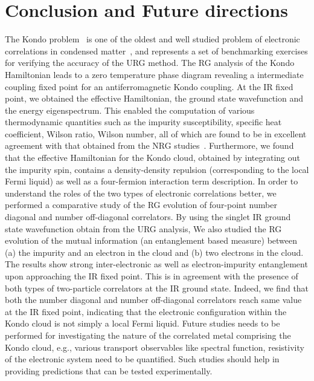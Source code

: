 \documentclass[aps,prb,preprint,groupedaddress]{revtex4-2}
\begin{document}
\section{Conclusion and Future directions}
The Kondo problem~\cite{kondo1964resistance} is one of the oldest and well studied problem of electronic correlations in condensed matter~\cite{anderson1970poor,wilson1975}, and represents a set of benchmarking exercises for verifying the accuracy of the URG method.  The RG analysis of the Kondo Hamiltonian leads to a zero temperature phase diagram revealing a intermediate coupling fixed point for an antiferromagnetic Kondo coupling. At the IR fixed point, we obtained the effective Hamiltonian, the ground state wavefunction and the energy eigenspectrum. This enabled the computation of various  thermodynamic quantities such as the impurity susceptibility, specific heat coefficient, Wilson ratio, Wilson number, all of which  are found to be in excellent agreement with that obtained from the NRG studies~\cite{bullaNRGreview}. 
\pin
Furthermore, we found that the effective Hamiltonian for the Kondo cloud, obtained by integrating out the impurity spin, contains a density-density repulsion (corresponding to the local Fermi liquid) as well as a four-fermion interaction term  description. In order to understand the roles of the two types of electronic correlations better, we performed a comparative study of the RG evolution of four-point number diagonal and number off-diagonal correlators. By using the singlet IR ground state wavefunction obtain from the URG analysis, We also studied the RG evolution of the mutual information (an entanglement based measure) between (a) the impurity and an electron in the cloud and (b) two electrons in the cloud. The results show strong inter-electronic as well as electron-impurity entanglement upon approaching the IR fixed point. This is in agreement with the presence of both types of two-particle correlators at the IR ground state. Indeed, we find that both the number diagonal and number off-diagonal correlators reach same value at the IR fixed point, indicating that the electronic configuration within the Kondo cloud is not simply a local Fermi liquid. 
Future studies needs to be performed for investigating the nature of the correlated metal comprising the Kondo cloud, e.g., various transport observables like  spectral function, resistivity of the electronic system need to be quantified. Such studies should help in providing predictions that can be tested experimentally. 
\end{document}
